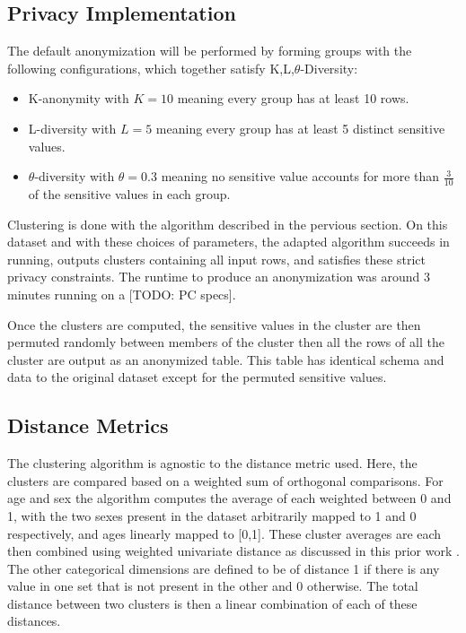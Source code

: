 \subsection{Privacy Implementation}
The default anonymization will be performed by forming groups with the following configurations, which together satisfy K,L,$\theta$-Diversity:
\begin{itemize}
    \item K-anonymity with $K=10$ meaning every group has at least 10 rows.
    \item L-diversity with $L=5$ meaning every group has at least 5 distinct sensitive values.
    \item $\theta$-diversity with $\theta=0.3$ meaning no sensitive value accounts for more than $\frac{3}{10}$ of the sensitive values in each group.
\end{itemize}

Clustering is done with the algorithm described in the pervious section. On this dataset and with these choices of parameters, the adapted algorithm succeeds in running, outputs clusters containing all input rows, and satisfies these strict privacy constraints. The runtime to produce an anonymization was around 3 minutes running on a [TODO: PC specs].


Once the clusters are computed, the sensitive values in the cluster are then permuted randomly between members of the cluster then all the rows of all the cluster are output as an anonymized table. This table has identical schema and data to the original dataset except for the permuted sensitive values.

\subsection{Distance Metrics}
The clustering algorithm is agnostic to the distance metric used. Here, the clusters are compared based on a weighted sum of orthogonal comparisons. For age and sex the algorithm computes the average of each weighted between 0 and 1, with the two sexes present in the dataset arbitrarily mapped to 1 and 0 respectively, and ages linearly mapped to [0,1]. These cluster averages are each then combined using weighted univariate distance as discussed in this prior work \cite{domingoPracticalCluster}. The other categorical dimensions are defined to be of distance 1 if there is any value in one set that is not present in the other and 0 otherwise. The total distance between two clusters is then a linear combination of each of these distances.

